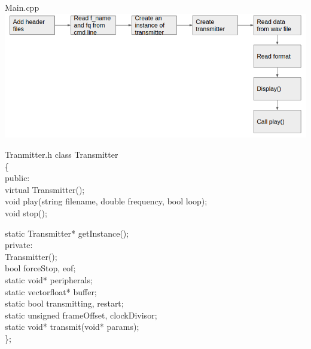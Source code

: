 \documentclass{beamer}
\begin{document}
\begin{frame}{Main.cpp}
\includegraphics[scale=0.4]{maiin.png}

\end{frame}



\begin{frame}{Tranmitter.h}
class Transmitter\\
\{\\
\qquad  public:\\
    \qquad \qquad    virtual  Transmitter();\\

      \qquad \qquad  void play(string filename, double frequency, bool loop);\\
       \qquad \qquad void stop();

      \qquad \qquad  static Transmitter* getInstance();\\
\qquad private:\\
       \qquad \qquad Transmitter();\\

       \qquad \qquad bool forceStop, eof;\\

       \qquad \qquad static void* peripherals;\\
        \qquad \qquad static vectorfloat* buffer;\\
       \qquad \qquad static bool transmitting, restart;\\
       \qquad \qquad static unsigned frameOffset, clockDivisor;\\
       \qquad \qquad static void* transmit(void* params);\\
\};\\

\end{frame}
\end{document}
